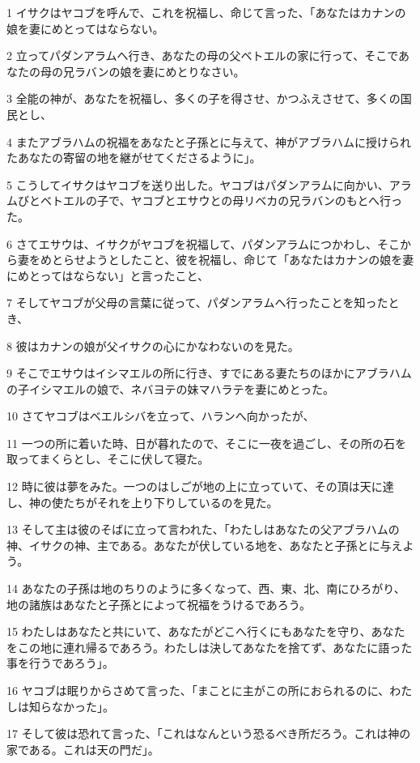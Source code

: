 \par 1 イサクはヤコブを呼んで、これを祝福し、命じて言った、「あなたはカナンの娘を妻にめとってはならない。
\par 2 立ってパダンアラムへ行き、あなたの母の父ベトエルの家に行って、そこであなたの母の兄ラバンの娘を妻にめとりなさい。
\par 3 全能の神が、あなたを祝福し、多くの子を得させ、かつふえさせて、多くの国民とし、
\par 4 またアブラハムの祝福をあなたと子孫とに与えて、神がアブラハムに授けられたあなたの寄留の地を継がせてくださるように」。
\par 5 こうしてイサクはヤコブを送り出した。ヤコブはパダンアラムに向かい、アラムびとベトエルの子で、ヤコブとエサウとの母リベカの兄ラバンのもとへ行った。
\par 6 さてエサウは、イサクがヤコブを祝福して、パダンアラムにつかわし、そこから妻をめとらせようとしたこと、彼を祝福し、命じて「あなたはカナンの娘を妻にめとってはならない」と言ったこと、
\par 7 そしてヤコブが父母の言葉に従って、パダンアラムへ行ったことを知ったとき、
\par 8 彼はカナンの娘が父イサクの心にかなわないのを見た。
\par 9 そこでエサウはイシマエルの所に行き、すでにある妻たちのほかにアブラハムの子イシマエルの娘で、ネバヨテの妹マハラテを妻にめとった。
\par 10 さてヤコブはベエルシバを立って、ハランへ向かったが、
\par 11 一つの所に着いた時、日が暮れたので、そこに一夜を過ごし、その所の石を取ってまくらとし、そこに伏して寝た。
\par 12 時に彼は夢をみた。一つのはしごが地の上に立っていて、その頂は天に達し、神の使たちがそれを上り下りしているのを見た。
\par 13 そして主は彼のそばに立って言われた、「わたしはあなたの父アブラハムの神、イサクの神、主である。あなたが伏している地を、あなたと子孫とに与えよう。
\par 14 あなたの子孫は地のちりのように多くなって、西、東、北、南にひろがり、地の諸族はあなたと子孫とによって祝福をうけるであろう。
\par 15 わたしはあなたと共にいて、あなたがどこへ行くにもあなたを守り、あなたをこの地に連れ帰るであろう。わたしは決してあなたを捨てず、あなたに語った事を行うであろう」。
\par 16 ヤコブは眠りからさめて言った、「まことに主がこの所におられるのに、わたしは知らなかった」。
\par 17 そして彼は恐れて言った、「これはなんという恐るべき所だろう。これは神の家である。これは天の門だ」。
